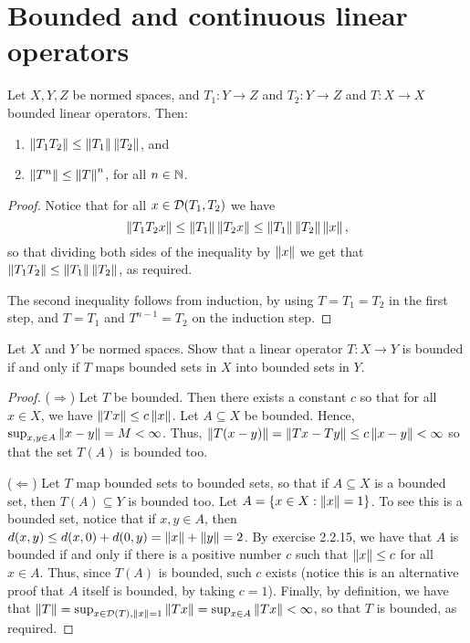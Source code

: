 \section{Bounded and continuous linear operators}


\begin{exercise}{1}
Let $X,Y,Z$ be normed spaces, and $T_1:Y\to Z$ and $T_2:Y\to Z$ and $T:X\to X$ bounded linear operators. Then:
\begin{enumerate}
    \item $\left\lVert T_1T_2\right\rVert\leq\left\lVert T_1\right\rVert\left\lVert T_2\right\rVert$, and
    \item $\left\lVert T^n\right\rVert\leq \left\lVert T\right\rVert^n$, for all $n\in\mathbb{N}$.
\end{enumerate}
\end{exercise}
\begin{proof}
Notice that for all $x\in\mathcal{D}(T_1,T_2)$ we have
\[
\left\lVert T_1T_2x\right\rVert\leq\left\lVert T_1\right\rVert\left\lVert T_2x\right\rVert\leq\left\lVert T_1\right\rVert\left\lVert T_2\right\rVert\left\lVert x\right\rVert,
\]
so that dividing both sides of the inequality by $\left\lVert x\right\rVert$ we get that $\left\lVert T_1T_2\right\rVert\leq\left\lVert T_1\right\rVert\left\lVert T_2\right\rVert$, as required.

The second inequality follows from induction, by using $T=T_1=T_2$ in the first step, and $T=T_1$ and $T^{n-1}=T_2$ on the induction step.
\end{proof}

\begin{exercise}{2}
Let $X$ and $Y$ be normed spaces. 
Show that a linear operator $T:X\to Y$ is bounded if and only if $T$ maps bounded sets in $X$ into bounded sets in $Y$.
\end{exercise}
\begin{proof}
($\Rightarrow$) Let $T$ be bounded. Then there exists a constant $c$ so that for all $x\in X$, we have $\left\lVert Tx\right\rVert\leq c\left\lVert x\right\rVert$. Let $A\subseteq X$ be bounded. Hence, $\sup_{x,y\in A}\left\lVert x-y\right\rVert=M<\infty$. Thus, $\left\lVert T(x-y)\right\rVert=\left\lVert Tx-Ty\right\rVert\leq c\left\lVert x-y\right\rVert<\infty$ so that the set $T(A)$ is bounded too.

($\Leftarrow$) Let $T$ map bounded sets to bounded sets, so that if $A\subseteq X$ is a bounded set, then $T(A)\subseteq Y$ is bounded too. Let $A=\{x\in X:\left\lVert x\right\rVert=1\}$. To see this is a bounded set, notice that if $x,y\in A$, then $d(x,y)\leq d(x,0)+d(0,y) =\left\lVert x\right\rVert+\left\lVert y\right\rVert=2$. By exercise 2.2.15, we have that $A$ is bounded if and only if there is a positive number $c$ such that $\left\lVert x\right\rVert\leq c$ for all $x\in A$. Thus, since $T(A)$ is bounded, such $c$ exists (notice this is an alternative proof that $A$ itself is bounded, by taking $c=1$). Finally, by definition, we have that $\left\lVert T\right\rVert =\sup_{x\in\mathcal{D}(T),\left\lVert x\right\rVert=1}\left\lVert Tx\right\rVert =\sup_{x\in A}\left\lVert Tx\right\rVert<\infty$, so that $T$ is bounded, as required.
\end{proof}

